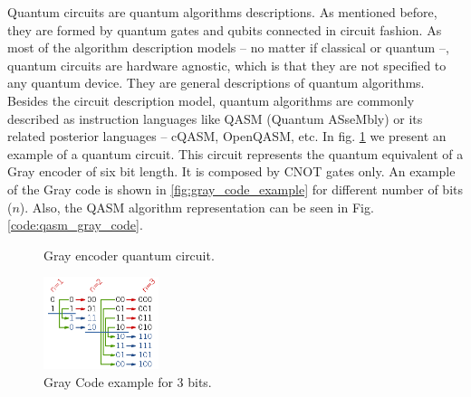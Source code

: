 Quantum circuits are quantum algorithms descriptions.
As mentioned before, they are formed by quantum gates and qubits connected in circuit fashion.
As most of the algorithm description models -- no matter if classical or quantum --, quantum circuits are hardware agnostic, which is that they are not specified to any quantum device.
They are general descriptions of quantum algorithms.
Besides the circuit description model, quantum algorithms are commonly described as instruction languages like QASM (Quantum ASseMbly) \cite{Nielsen_2009} or its related posterior languages -- cQASM, OpenQASM, etc.
In fig. \ref{fig:circuit_example} we present an example of a quantum circuit.
This circuit represents the quantum equivalent of a Gray encoder of six bit length.
It is composed by CNOT gates only.
An example of the Gray code is shown in \ref{fig:gray_code_example} for different number of bits (\(n\)).
Also, the QASM algorithm representation can be seen in Fig. \ref{code:qasm_gray_code}.

\begin{figure}
    \centering


\label{fig:circuit_example}
\caption{Gray encoder quantum circuit.}
\end{figure}

\begin{figure}[htbp]
\centering
\includegraphics[width=0.3\textwidth]{figures/gray_code.png}
\caption{\label{fig:org8846b21}
Gray Code example for 3 bits.}
\end{figure}

